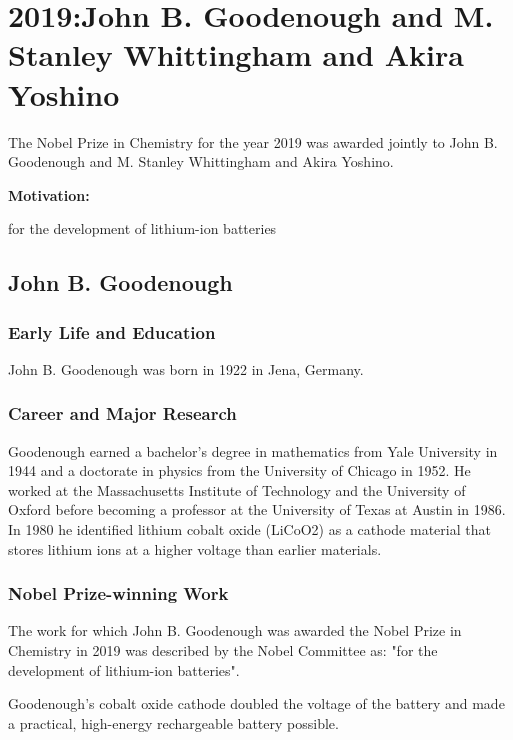 \chapter{2019:John B. Goodenough and M. Stanley Whittingham and Akira Yoshino}

\label{chap:chemistry2019}

The Nobel Prize in Chemistry for the year 2019 was awarded jointly to John B. Goodenough and M. Stanley Whittingham and Akira Yoshino.

\textbf{Motivation:}

for the development of lithium-ion batteries

\section{John B. Goodenough}

\subsection*{Early Life and Education}

John B. Goodenough was born in 1922 in Jena, Germany.

\subsection*{Career and Major Research}

Goodenough earned a bachelor's degree in mathematics from Yale University in 1944 and a doctorate in physics from the University of Chicago in 1952. He worked at the Massachusetts Institute of Technology and the University of Oxford before becoming a professor at the University of Texas at Austin in 1986. In 1980 he identified lithium cobalt oxide (LiCoO2) as a cathode material that stores lithium ions at a higher voltage than earlier materials.

\subsection*{Nobel Prize-winning Work}

The work for which John B. Goodenough was awarded the Nobel Prize in Chemistry in 2019 was described by the Nobel Committee as: "for the development of lithium-ion batteries".

Goodenough's cobalt oxide cathode doubled the voltage of the battery and made a practical, high-energy rechargeable battery possible.

